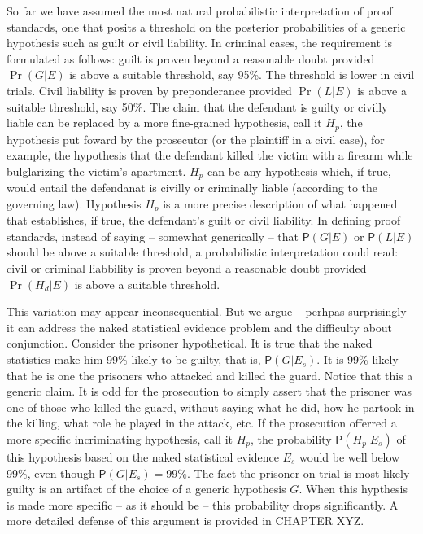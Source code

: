 \documentclass[10pt,dvipsnames,enabledeprecatedfontcommands]{scrartcl}
\newcommand{\pr}[1]{\mathsf{P}(#1)}
\begin{document}
So far we have assumed the most natural probabilistic interpretation of
proof standards, one that posits a threshold on the posterior
probabilities of a generic hypothesis such as guilt or civil liability.
In criminal cases, the requirement is formulated as follows: guilt is
proven beyond a reasonable doubt provided \(\Pr(G | E)\) is above a
suitable threshold, say 95\%. The threshold is lower in civil trials.
Civil liability is proven by preponderance provided \(\Pr(L | E)\) is
above a suitable threshold, say 50\%. The claim that the defendant is
guilty or civilly liable can be replaced by a more fine-grained
hypothesis, call it \(H_p\), the hypothesis put foward by the prosecutor
(or the plaintiff in a civil case), for example, the hypothesis that the
defendant killed the victim with a firearm while bulglarizing the
victim's apartment. \(H_p\) can be any hypothesis which, if true, would
entail the defendanat is civilly or criminally liable (according to the
governing law). Hypothesis \(H_p\) is a more precise description of what
happened that establishes, if true, the defendant's guilt or civil
liability. In defining proof standards, instead of saying -- somewhat
generically -- that \(\pr{G | E}\) or \(\pr{L | E}\) should be above a
suitable threshold, a probabilistic interpretation could read: civil or
criminal liabbility is proven beyond a reasonable doubt provided
\(\Pr(H_d | E)\) is above a suitable threshold.

This variation may appear inconsequential. But we argue -- perhpas
surprisingly -- it can address the naked statistical evidence problem
and the difficulty about conjunction. Consider the prisoner
hypothetical. It is true that the naked statistics make him 99\% likely
to be guilty, that is, \(\pr{G | E_s}\). It is 99\% likely that he is
one the prisoners who attacked and killed the guard. Notice that this a
generic claim. It is odd for the prosecution to simply assert that the
prisoner was one of those who killed the guard, without saying what he
did, how he partook in the killing, what role he played in the attack,
etc. If the prosecution offerred a more specific incriminating
hypothesis, call it \(H_p\), the probability \(\pr{H_p | E_{s}}\) of
this hypothesis based on the naked statistical evidence \(E_s\) would be
well below 99\%, even though \(\pr{G | E_s}=99\%\). The fact the
prisoner on trial is most likely guilty is an artifact of the choice of
a generic hypothesis \(G\). When this hypthesis is made more specific --
as it should be -- this probability drops significantly. A more detailed
defense of this argument is provided in CHAPTER XYZ.
\end{document}
